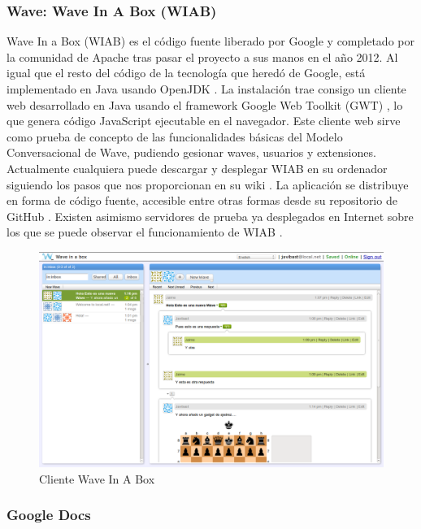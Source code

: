 	\subsubsection{Wave: Wave In A Box (WIAB)}\label{sssec:wiab}
	    
	Wave In a Box (WIAB) \cite{ref:wave_in_a_box} es el código fuente liberado por Google y completado por la comunidad de Apache tras pasar el proyecto a sus manos en el año 2012. Al igual que el resto del código de la tecnología que heredó de Google, está implementado en Java usando OpenJDK \cite{ref:openjdk}. La instalación trae consigo un cliente web desarrollado en Java usando el framework Google Web Toolkit (GWT) \cite{ref:gwt}, lo que genera código JavaScript ejecutable en el navegador. Este cliente web sirve como prueba de concepto de las funcionalidades básicas del Modelo Conversacional de Wave, pudiendo gesionar waves, usuarios y extensiones. Actualmente cualquiera puede descargar y desplegar WIAB en su ordenador siguiendo los pasos que nos proporcionan en su wiki \cite{ref:wave_in_a_box_wiki}. La aplicación se distribuye en forma de código fuente, accesible entre otras formas desde su repositorio de GitHub \cite{ref:wave_in_a_box_github}. Existen asimismo servidores de prueba ya desplegados en Internet sobre los que se puede observar el funcionamiento de WIAB \cite{ref:wave_in_a_box_server}.
   		
	\begin{figure}[H]
      \centering
		\includegraphics[keepaspectratio, scale=0.3]{Media/Captures/WIAB_Server.png}
      \caption{Cliente Wave In A Box}
      \label{fig:wiab_client}
    \end{figure} 	
	
	\subsubsection{Google Docs}
	
